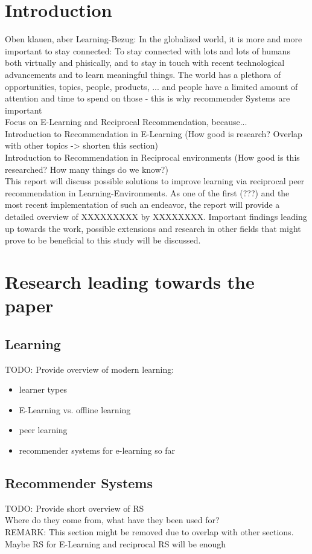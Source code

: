 \documentclass[nochapterpage,bigchapter,linedtoc,longdoc,colorback,accentcolor=tud3b]{tudreport}
\begin{document}
\chapter{Introduction}
Oben klauen, aber Learning-Bezug: In the globalized world, it is more and more important to stay connected: To stay connected with lots and lots of humans both virtually and phisically, and to stay in touch with recent technological advancements and to learn meaningful things. The world has a plethora of opportunities, topics, people, products, ... and people have a limited amount of attention and time to spend on those - this is why recommender Systems are important\\
Focus on E-Learning and Reciprocal Recommendation, because...\\
Introduction to Recommendation in E-Learning (How good is research? Overlap with other topics -> shorten this section)\\
Introduction to Recommendation in Reciprocal environments (How good is this researched? How many things do we know?)\\
This report will discuss possible solutions to improve learning via reciprocal peer recommendation in Learning-Environments. As one of the first (???) and the most recent implementation of such an endeavor, the report will provide a detailed overview of XXXXXXXXX by XXXXXXXX. Important findings leading up towards the work, possible extensions and research in other fields that might prove to be beneficial to this study will be discussed.\\

\chapter{Research leading towards the paper}
\section{Learning}
TODO: Provide overview of modern learning:\\
\begin{itemize}
	\item learner types
	\item E-Learning vs. offline learning
	\item peer learning
	\item recommender systems for e-learning so far
\end{itemize}

\section{Recommender Systems}
TODO: Provide short overview of RS\\
Where do they come from, what have they been used for?\\
REMARK: This section might be removed due to overlap with other sections. Maybe RS for E-Learning and reciprocal RS will be enough\\
\end{document}
